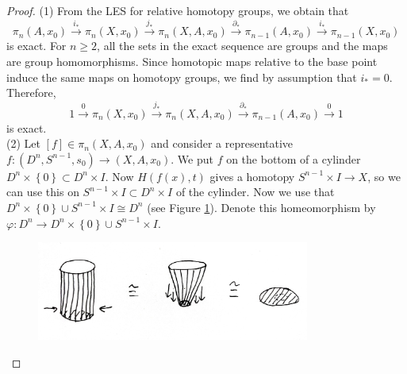     \begin{proof}
        (1) From the LES for relative homotopy groups, we obtain that
        \[
        \pi_n (A, x_0) \stackrel{i_*}{\to}  \pi_n(X,x_0)
        \stackrel{j_*}{\to} \pi_n \left( X, A, x_0 \right) 
        \stackrel{\partial_*}{\to} 
        \pi_{n-1}(A,x_0) \stackrel{i_*}{\to} 
        \pi_{n-1} \left( X, x_0 \right) 
        \] 
        is exact.
        For $n\ge 2$, all the sets in the exact sequence are
        groups and the maps are group homomorphisms.
        Since homotopic maps relative to the base point induce
        the same maps on homotopy groups, we find by assumption
        that $i_* = 0$. Therefore,
        \[
        1 \stackrel{0}{\to}   \pi_n(X,x_0)
        \stackrel{j_*}{\to} \pi_n \left( X, A, x_0 \right) 
        \stackrel{\partial_*}{\to} 
        \pi_{n-1}(A,x_0) \stackrel{0}{\to} 
        1
        \] 
        is exact.\\
        \linebreak
        (2) Let
        $\left[ f \right] \in \pi_n \left( X, A,x_0 \right) $
        and consider a representative
        $f \colon \left( D^{n}, S^{n-1},
        s_0 \right) \to 
        \left( X,A,x_0 \right) $.
        We put $f$ on the bottom of a cylinder
        $D^{n} \times \left\{ 0 \right\} \subset 
        D^{n} \times I$.
        Now $H \left( f(x),t \right) $ 
        gives a homotopy
        $S^{n-1} \times I \to X$, so we
        can use this on 
        $S^{n-1} \times I \subset 
        D^{n} \times I$ of the cylinder.
        Now we use that
        $D^{n} \times \left\{ 0 \right\} 
        \cup S^{n-1} \times I \cong
        D^{n}$ (see Figure \ref{fig:p31-jpeg}). 
        Denote this
        homeomorphism by $\varphi 
        \colon D^{n} \to D^{n} \times \left\{ 0 \right\} \cup 
        S^{n-1} \times I$.

        \begin{figure}[htpb]
            \centering
            \includegraphics[width=0.8\textwidth]{Figures/p31.jpeg}
            \caption{}
            \label{fig:p31-jpeg}
        \end{figure}


\end{proof}
